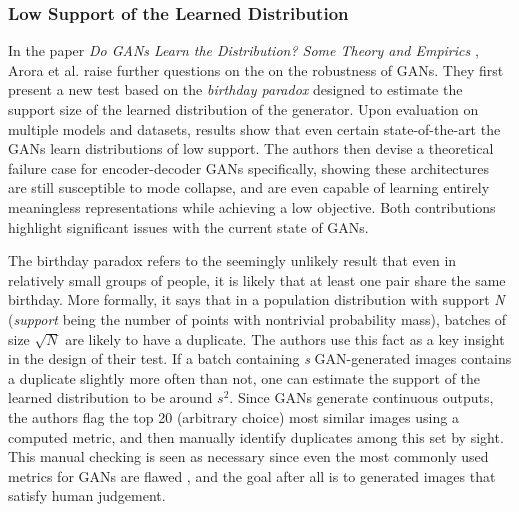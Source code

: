 \subsubsection{Low Support of the Learned Distribution}

In the paper \textit{Do GANs Learn the Distribution? Some Theory and Empirics} \cite{arora2018do}, Arora et al. raise further questions on the on the robustness of GANs. They first present a new test based on the \textit{birthday paradox} designed to estimate the support size of the learned distribution of the generator. Upon evaluation on multiple models and datasets, results show that even certain state-of-the-art the GANs learn distributions of low support. The authors then devise a theoretical failure case for encoder-decoder GANs specifically, showing these architectures are still susceptible to mode collapse, and are even capable of learning entirely meaningless representations while achieving a low objective. Both contributions highlight significant issues with the current state of GANs.


The birthday paradox refers to the seemingly unlikely result that even in relatively small groups of people, it is likely that at least one pair share the same birthday. More formally, it says that in a population distribution with support \textit{N} (\textit{support} being the number of points with nontrivial probability mass), batches of size $\sqrt{N}$ are likely to have a duplicate. The authors use this fact as a key insight in the design of their test. If a batch containing \textit{s} GAN-generated images contains a duplicate slightly more often than not, one can estimate the support of the learned distribution to be around $s^2$. Since GANs generate continuous outputs, the authors flag the top 20 (arbitrary choice) most similar images using a computed metric, and then manually identify duplicates among this set by sight. This manual checking is seen as necessary since even the most commonly used metrics for GANs are flawed \cite{barratt2018note}, and the goal after all is to generated images that satisfy human judgement.


